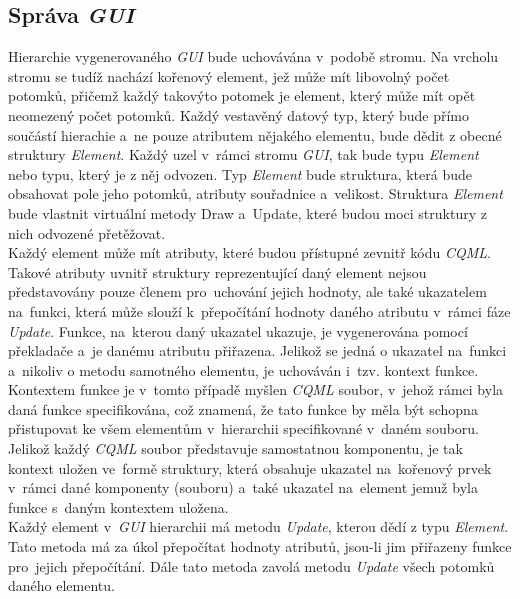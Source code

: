 \documentclass[11pt,twoside,a4paper]{book}
\begin{document}
\subsection {Správa \textit{GUI}}
Hierarchie vygenerovaného \textit{GUI} bude uchovávána v~podobě stromu. Na vrcholu stromu se tudíž nachází kořenový element, jež může mít libovolný počet potomků, přičemž každý takovýto potomek je element, který může mít opět neomezený počet potomků. Každý vestavěný datový typ, který bude přímo součástí hierachie a~ne pouze atributem nějakého elementu, bude dědit z obecné struktury \textit{Element}. Každý uzel v~rámci stromu \textit{GUI}, tak bude typu \textit{Element} nebo typu, který je z něj odvozen. Typ \textit{Element} bude struktura, která bude obsahovat pole jeho potomků, atributy souřadnice a~velikost. Struktura \textit{Element} bude vlastnit virtuální metody Draw a~Update, které budou moci struktury z nich odvozené přetěžovat.\\
Každý element může mít atributy, které budou přístupné zevnitř kódu \textit{CQML}. Takové atributy uvnitř struktury reprezentující daný element nejsou představovány pouze členem pro~uchování jejich hodnoty, ale také ukazatelem na~funkci, která může slouží k~přepočítání hodnoty daného atributu v~rámci fáze \textit{Update}. Funkce, na~kterou daný ukazatel ukazuje, je vygenerována pomocí překladače a~je danému atributu přiřazena. Jelikož se jedná o ukazatel na~funkci a~nikoliv o metodu samotného elementu, je uchováván i~tzv. kontext funkce. Kontextem funkce je v~tomto případě myšlen \textit{CQML} soubor, v~jehož rámci byla daná funkce specifikována, což znamená, že tato funkce by měla být schopna přistupovat ke všem elementům v~hierarchii specifikované v~daném souboru. Jelikož každý \textit{CQML} soubor představuje samostatnou komponentu, je tak kontext uložen ve~formě struktury, která obsahuje ukazatel na~kořenový prvek v~rámci dané komponenty (souboru) a~také ukazatel na~element jemuž byla funkce s~daným kontextem uložena.\\
Každý element v~\textit{GUI} hierarchii má metodu \textit{Update}, kterou dědí z typu \textit{Element}. Tato metoda má za úkol přepočítat hodnoty atributů, jsou-li jim přiřazeny funkce pro~jejich přepočítání. Dále tato metoda zavolá metodu \textit{Update} všech potomků daného elementu.
\end{document}
